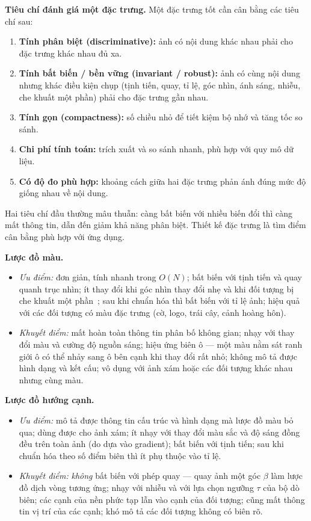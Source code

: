 \textbf{Tiêu chí đánh giá một đặc trưng.} Một đặc trưng tốt cần cân bằng các tiêu chí sau:
\begin{enumerate}
    \item \textbf{Tính phân biệt (discriminative):} ảnh có nội dung khác nhau phải cho đặc trưng khác nhau đủ xa.
    \item \textbf{Tính bất biến / bền vững (invariant / robust):} ảnh có cùng nội dung nhưng khác điều kiện chụp (tịnh tiến, quay, tỉ lệ, góc nhìn, ánh sáng, nhiễu, che khuất một phần) phải cho đặc trưng gần nhau.
    \item \textbf{Tính gọn (compactness):} số chiều nhỏ để tiết kiệm bộ nhớ và tăng tốc so sánh.
    \item \textbf{Chi phí tính toán:} trích xuất và so sánh nhanh, phù hợp với quy mô dữ liệu.
    \item \textbf{Có độ đo phù hợp:} khoảng cách giữa hai đặc trưng phản ánh đúng mức độ giống nhau về nội dung.
\end{enumerate}
Hai tiêu chí đầu thường mâu thuẫn: càng bất biến với nhiều biến đổi thì càng mất thông tin, dẫn đến giảm khả năng phân biệt. Thiết kế đặc trưng là tìm điểm cân bằng phù hợp với ứng dụng.

\textbf{Lược đồ màu.}
\begin{itemize}
    \item \emph{Ưu điểm:} đơn giản, tính nhanh trong $O(N)$; bất biến với tịnh tiến và quay quanh trục nhìn; ít thay đổi khi góc nhìn thay đổi nhẹ và khi đối tượng bị che khuất một phần~\citep{swain1991color}; sau khi chuẩn hóa thì bất biến với tỉ lệ ảnh; hiệu quả với các đối tượng có màu đặc trưng (cờ, logo, trái cây, cảnh hoàng hôn).
    \item \emph{Khuyết điểm:} mất hoàn toàn thông tin phân bố không gian; nhạy với thay đổi màu và cường độ nguồn sáng; hiệu ứng biên ô — một màu nằm sát ranh giới ô có thể nhảy sang ô bên cạnh khi thay đổi rất nhỏ; không mô tả được hình dạng và kết cấu; vô dụng với ảnh xám hoặc các đối tượng khác nhau nhưng cùng màu.
\end{itemize}

\textbf{Lược đồ hướng cạnh.}
\begin{itemize}
    \item \emph{Ưu điểm:} mô tả được thông tin cấu trúc và hình dạng mà lược đồ màu bỏ qua; dùng được cho ảnh xám; ít nhạy với thay đổi màu sắc và độ sáng đồng đều trên toàn ảnh (do dựa vào gradient); bất biến với tịnh tiến; sau khi chuẩn hóa theo số điểm biên thì ít phụ thuộc vào tỉ lệ.
    \item \emph{Khuyết điểm:} \emph{không} bất biến với phép quay — quay ảnh một góc $\beta$ làm lược đồ dịch vòng tương ứng; nhạy với nhiễu và với lựa chọn ngưỡng $\tau$ của bộ dò biên; các cạnh của nền phức tạp lẫn vào cạnh của đối tượng; cũng mất thông tin vị trí của các cạnh; khó mô tả các đối tượng không có biên rõ.
\end{itemize}

